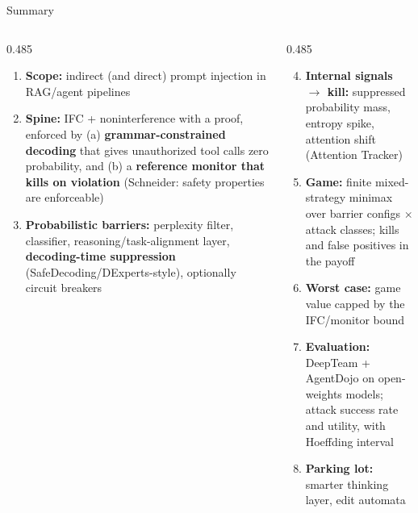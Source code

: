 \documentclass[aspectratio=169, 11pt]{beamer}
\begin{document}
\begin{frame}{Summary}
    \scriptsize
    \begin{columns}[t, onlytextwidth]
        \begin{column}{0.485\textwidth}
            \begin{plaincard}[AccentBlue]
                \begin{enumerate}
                    \setlength\itemsep{0.45em}
                    \item \textbf{Scope:} indirect (and direct) prompt injection in RAG/agent pipelines
                    \item \textbf{Spine:} IFC + noninterference with a proof, enforced by (a) \textbf{grammar-constrained decoding} that gives unauthorized tool calls zero probability, and (b) a \textbf{reference monitor that kills on violation} (Schneider: safety properties are enforceable)
                    \item \textbf{Probabilistic barriers:} perplexity filter, classifier, reasoning/task-alignment layer, \textbf{decoding-time suppression} (SafeDecoding/DExperts-style), optionally circuit breakers
                \end{enumerate}
            \end{plaincard}
        \end{column}
        \begin{column}{0.485\textwidth}
            \begin{plaincard}[AccentIndigo]
                \begin{enumerate}
                    \setcounter{enumi}{3}
                    \setlength\itemsep{0.35em}
                    \item \textbf{Internal signals $\rightarrow$ kill:} suppressed probability mass, entropy spike, attention shift (Attention Tracker)
                    \item \textbf{Game:} finite mixed-strategy minimax over barrier configs $\times$ attack classes; kills and false positives in the payoff
                    \item \textbf{Worst case:} game value capped by the IFC/monitor bound
                    \item \textbf{Evaluation:} DeepTeam + AgentDojo on open-weights models; attack success rate and utility, with Hoeffding interval
                    \item \textbf{Parking lot:} smarter thinking layer, edit automata
                \end{enumerate}
            \end{plaincard}
        \end{column}
    \end{columns}
\end{frame}
\end{document}
